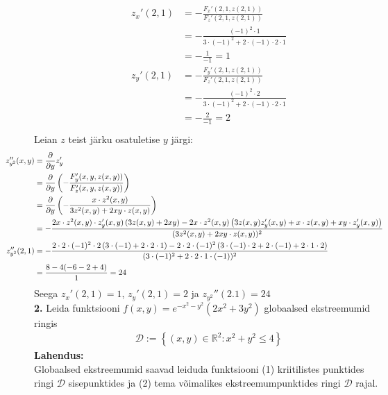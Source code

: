 \documentclass{article}
\newcommand{\p}[1]{\frac{\partial}{\partial #1}}
\begin{document}
\begin{gather*}
\begin{aligned}
z_x'(2,1)&=-\frac{F_x'(2,1,z(2,1))}{F_z'(2,1,z(2,1))}\\
&=-\frac{(-1)^2\cdot1}{3\cdot(-1)^2+2\cdot(-1)\cdot2\cdot1}\\
&=-\frac{1}{-1}=1\\
z_y'(2,1)&=-\frac{F_y'(2,1,z(2,1))}{F_z'(2,1,z(2,1))}\\
&=-\frac{(-1)^2\cdot2}{3\cdot(-1)^2+2\cdot(-1)\cdot2\cdot1}\\
&=-\frac{2}{-1}=2\\
\end{aligned}
\end{gather*}
Leian $z$ teist järku osatuletise $y$ järgi:
\begin{gather*}
\begin{aligned}
\hspace{-10\parindent}
z_{y^2}''(x,y)&=\p{y}z_y'\\
&=\p{y}\left(-\frac{F_y'(x,y,z(x,y))}{F_z'(x,y,z(x,y))}\right)\\
&=\p{y}\left(-\frac{x\cdot z^2(x,y)}{3z^2(x,y)+2xy\cdot z(x,y)}\right)\\
&=-\frac{2x\cdot z^2(x,y)\cdot z_y'(x,y)\left(3z(x,y)+2xy\right)-2x\cdot z^2(x,y)\left(3z(x,y)z_y'(x,y)+x\cdot z(x,y)+xy\cdot z_y'(x,y)\right)}{(3z^2(x,y)+2xy\cdot z(x,y))^2}\\
\hspace{-10\parindent}
z_{y^2}''(2,1)&=-\frac{2\cdot2\cdot (-1)^2\cdot 2\left(3\cdot(-1)+2\cdot2\cdot1\right)-2\cdot2\cdot (-1)^2\left(3\cdot(-1)\cdot2+2\cdot (-1)+2\cdot1\cdot 2\right)}{(3\cdot(-1)^2+2\cdot2\cdot1\cdot (-1))^2}\\
&=\frac{8-4(-6-2+4)}{1}=24
\end{aligned}
\end{gather*}
Seega $z_x'(2,1)=1$, $z_y'(2,1)=2$ ja $z_{y^2}''(2.1)=24$\pagebreak\\
\textbf{2.} Leida funktsiooni $f(x,y)=e^{-x^2-y^2}(2x^2+3y^2)$ globaalsed ekstreemumid ringis
\begin{gather*}
\mathcal{D}:=\left\{(x,y)\in\mathbb{R}^2:x^2+y^2\leq4\right\}
\end{gather*}
\textbf{Lahendus:}\\
Globaalsed ekstreemumid saavad leiduda funktsiooni (1) kriitilistes punktides ringi $\mathcal{D}$ sisepunktides ja (2) tema võimalikes ekstreemumpunktides ringi $\mathcal{D}$ rajal.\\
\end{document}
